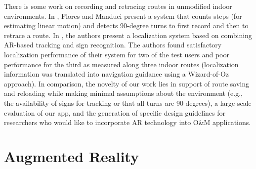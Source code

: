\documentclass[chi_draft]{sigchi}
\newcommand{\BVI}{B/VI\xspace}
\newcommand{\OM}{O\&M\xspace}
\begin{document}
There is some work on recording and retracing routes in unmodified indoor environments.  In \cite{flores2018easy, flores2014ariadne}, Flores and Manduci present a system that counts steps (for estimating linear motion) and detects 90-degree turns to first record and then to retrace a route.  In \cite{fusco2018indoor}, the authors present a localization system based on combining AR-based tracking and sign recognition.  The authors found satisfactory localization performance of their system for two of the test users and poor performance for the third as measured along three indoor routes (localization information was translated into navigation guidance using a Wizard-of-Oz approach).  In comparison, the novelty of our work lies in support of route saving and reloading while making minimal assumptions about the environment (e.g., the availability of signs for tracking or that all turns are 90 degrees), a large-scale evaluation of our app, and the generation of specific design guidelines for researchers who would like to incorporate AR technology into \OM applications.


\section{Augmented Reality}
%
\end{document}
